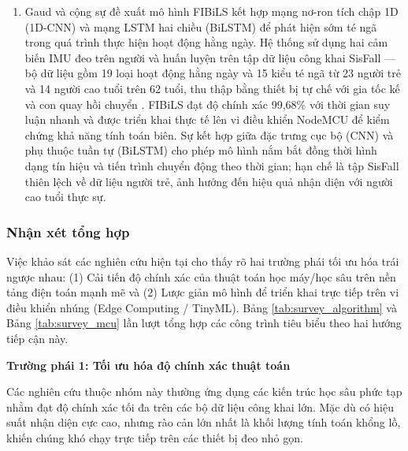 \documentclass[../DoAn.tex]{subfiles}
\begin{document}
\begin{enumerate}[label=\arabic*)]
\item Gaud và cộng sự \cite{gaud2025fibils} đề xuất mô hình FIBiLS kết hợp mạng nơ-ron tích chập 1D (1D-CNN) và mạng LSTM hai chiều (BiLSTM) để phát hiện sớm té ngã trong quá trình thực hiện hoạt động hằng ngày. Hệ thống sử dụng hai cảm biến IMU đeo trên người và huấn luyện trên tập dữ liệu công khai SisFall --- bộ dữ liệu gồm 19 loại hoạt động hằng ngày và 15 kiểu té ngã từ 23 người trẻ và 14 người cao tuổi trên 62 tuổi, thu thập bằng thiết bị tự chế với gia tốc kế và con quay hồi chuyển \cite{sucerquia2017sisfall}. FIBiLS đạt độ chính xác 99,68\% với thời gian suy luận nhanh và được triển khai thực tế lên vi điều khiển NodeMCU để kiểm chứng khả năng tính toán biên. Sự kết hợp giữa đặc trưng cục bộ (CNN) và phụ thuộc tuần tự (BiLSTM) cho phép mô hình nắm bắt đồng thời hình dạng tín hiệu và tiến trình chuyển động theo thời gian; hạn chế là tập SisFall thiên lệch về dữ liệu người trẻ, ảnh hưởng đến hiệu quả nhận diện với người cao tuổi thực sự.

\end{enumerate}

\subsubsection{Nhận xét tổng hợp}
\label{subsubsection:2.1.2.d}

Việc khảo sát các nghiên cứu hiện tại cho thấy rõ hai trường phái tối ưu hóa trái ngược nhau: (1) Cải tiến độ chính xác của thuật toán học máy/học sâu trên nền tảng điện toán mạnh mẽ và (2) Lược giản mô hình để triển khai trực tiếp trên vi điều khiển nhúng (Edge Computing / TinyML). Bảng \ref{tab:survey_algorithm} và Bảng \ref{tab:survey_mcu} lần lượt tổng hợp các công trình tiêu biểu theo hai hướng tiếp cận này.

\textbf{Trường phái 1: Tối ưu hóa độ chính xác thuật toán}

Các nghiên cứu thuộc nhóm này thường ứng dụng các kiến trúc học sâu phức tạp nhằm đạt độ chính xác tối đa trên các bộ dữ liệu công khai lớn. Mặc dù có hiệu suất nhận diện cực cao, nhưng rào cản lớn nhất là khối lượng tính toán khổng lồ, khiến chúng khó chạy trực tiếp trên các thiết bị đeo nhỏ gọn.
\end{document}
